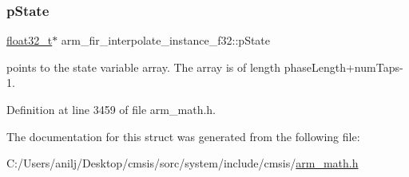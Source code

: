 \mbox{\label{structarm__fir__interpolate__instance__f32_a42a8ba1bda85fa86d7b6c84d3da4c75b}} 
\subsubsection{\texorpdfstring{p\+State}{pState}}
{\footnotesize\ttfamily \hyperlink{arm__math_8h_a4611b605e45ab401f02cab15c5e38715}{float32\+\_\+t}$\ast$ arm\+\_\+fir\+\_\+interpolate\+\_\+instance\+\_\+f32\+::p\+State}

points to the state variable array. The array is of length phase\+Length+num\+Taps-\/1. 

Definition at line 3459 of file arm\+\_\+math.\+h.



The documentation for this struct was generated from the following file\+:\begin{DoxyCompactItemize}
\item 
C\+:/\+Users/anilj/\+Desktop/cmsis/sorc/system/include/cmsis/\hyperlink{arm__math_8h}{arm\+\_\+math.\+h}\end{DoxyCompactItemize}

